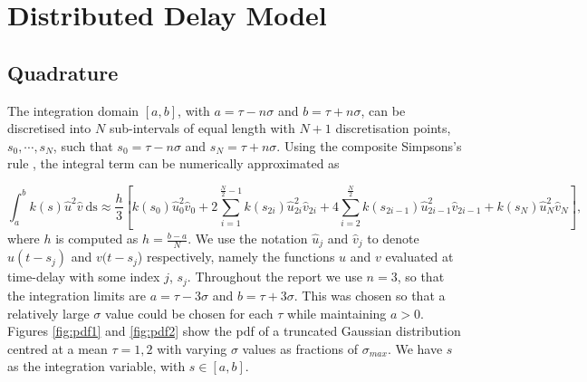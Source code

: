 \chapter{Distributed Delay Model}

\section{Quadrature}\label{section:quad}
The integration domain $[a, b]$, with $a=\tau-n\sigma$ and $b=\tau+n\sigma$, can be discretised into $N$ sub-intervals of equal length with $N+1$ discretisation points, $s_0,\cdots,s_{N}$, such that $s_0=\tau-n\sigma$ and $s_N=\tau+n\sigma$. Using the composite Simpsons's rule \cite{compsimp}, the integral term can be numerically approximated as

\begin{equation}\label{simp}\int_{a}^{b}k(s)\hat{u}^2\hat{v}\  \text{ds}\approx\frac{h}{3}\left[k(s_0)\hat{u}^2_0\hat{v}_0+2\sum_{i=1}^{\frac{N}{2}-1}k(s_{2i})\hat{u}^2_{2i}\hat{v}_{2i}+4\sum_{i=2}^{\frac{N}{2}}k(s_{2i-1})\hat{u}^2_{2i-1}\hat{v}_{2i-1}+k(s_N)\hat{u}^2_N\hat{v}_N\right],
\end{equation}
where $h$ is computed as $h=\frac{b-a}{N}$. We use the notation $\hat{u}_j$ and $\hat{v}_j$ to denote $u(t-s_j)$ and $v(t-s_j$) respectively, namely the functions $u$ and $v$ evaluated at time-delay with some index $j$, $s_j$. Throughout the report we use $n=3$, so that the integration limits are $a=\tau-3\sigma$ and $b=\tau+3\sigma$. This was chosen so that a relatively large $\sigma$ value could be chosen for each $\tau$ while maintaining $a>0$.
Figures \ref{fig:pdf1} and \ref{fig:pdf2} show the pdf of a truncated Gaussian distribution centred at a mean $\tau=1,2$ with varying $\sigma$ values as fractions of $\sigma_{max}$. We have $s$ as the integration variable, with $s\in[a,b]$.

